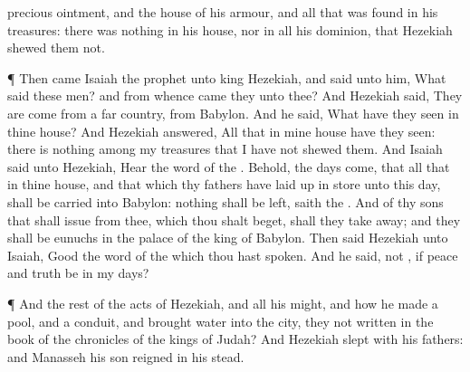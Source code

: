 {precious
ointment, and
{} the
house of his
armour, and all that was
found in his
treasures: there was
nothing in his
house, nor in all his
dominion, that
Hezekiah
shewed them not.
\par }{\PP {}¶ Then
came
Isaiah the
prophet unto
king
Hezekiah, and
said unto him, What
said these
men? and from
whence
came they unto thee? And
Hezekiah
said, They are
come from a
far
country,
{} from
Babylon.
And he
said, What have they
seen in thine
house? And
Hezekiah
answered, All
{} that
{} in mine
house have they
seen: there is
nothing among my
treasures that I have not
shewed them.
And
Isaiah
said unto
Hezekiah,
Hear the
word of the
{}.
Behold, the
days
come, that all that
{} in thine
house, and that which thy
fathers have laid up in
store unto this
day, shall be
carried into
Babylon:
nothing shall be
left,
saith the
{}.
And of thy
sons that shall
issue from thee, which thou shalt
beget, shall they take
away; and they shall be
eunuchs in the
palace of the
king of
Babylon.
Then
said
Hezekiah unto
Isaiah,
Good
{} the
word of the
{} which thou hast
spoken. And he
said,
{} not
{}, if
peace and
truth be in my
days?
\par }{\PP {}¶ And the
rest of the
acts of
Hezekiah, and all his
might, and how he
made a
pool, and a
conduit, and
brought
water into the
city,
{} they not
written in the
book of the
chronicles of the
kings of
Judah?
And
Hezekiah
slept with his
fathers: and
Manasseh his
son
reigned in his stead.

}
